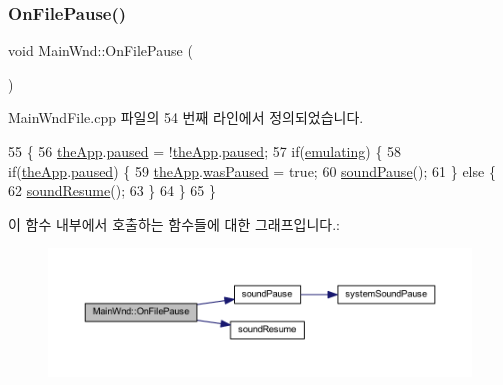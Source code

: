 \mbox{\label{class_main_wnd_a31048c989663d5e2121c2e96b6c8408d}} 
\subsubsection{\texorpdfstring{On\+File\+Pause()}{OnFilePause()}}
{\footnotesize\ttfamily void Main\+Wnd\+::\+On\+File\+Pause (\begin{DoxyParamCaption}{ }\end{DoxyParamCaption})\hspace{0.3cm}{\ttfamily [protected]}}



Main\+Wnd\+File.\+cpp 파일의 54 번째 라인에서 정의되었습니다.


\begin{DoxyCode}
55 \{
56   \mbox{\hyperlink{_v_b_a_8cpp_a8095a9d06b37a7efe3723f3218ad8fb3}{theApp}}.\mbox{\hyperlink{class_v_b_a_af7447bf3bf3f93948d2757e4cb223cfc}{paused}} = !\mbox{\hyperlink{_v_b_a_8cpp_a8095a9d06b37a7efe3723f3218ad8fb3}{theApp}}.\mbox{\hyperlink{class_v_b_a_af7447bf3bf3f93948d2757e4cb223cfc}{paused}};
57   \textcolor{keywordflow}{if}(\mbox{\hyperlink{_main_wnd_file_8cpp_af9cc36078b1b311753963297ae7f2a74}{emulating}}) \{
58     \textcolor{keywordflow}{if}(\mbox{\hyperlink{_v_b_a_8cpp_a8095a9d06b37a7efe3723f3218ad8fb3}{theApp}}.\mbox{\hyperlink{class_v_b_a_af7447bf3bf3f93948d2757e4cb223cfc}{paused}}) \{
59       \mbox{\hyperlink{_v_b_a_8cpp_a8095a9d06b37a7efe3723f3218ad8fb3}{theApp}}.\mbox{\hyperlink{class_v_b_a_a3c2e2ea8cb921007fcf2764da22c06e0}{wasPaused}} = \textcolor{keyword}{true};
60       \mbox{\hyperlink{_sound_8cpp_a0716e7957671de324eeaa4ac1729d6b7}{soundPause}}();
61     \} \textcolor{keywordflow}{else} \{
62       \mbox{\hyperlink{gb_sound_8cpp_af13240822604abd91b4e2370062f195e}{soundResume}}();
63     \}
64   \}
65 \}
\end{DoxyCode}
이 함수 내부에서 호출하는 함수들에 대한 그래프입니다.\+:
\nopagebreak
\begin{figure}[H]
\begin{center}
\leavevmode
\includegraphics[width=350pt]{class_main_wnd_a31048c989663d5e2121c2e96b6c8408d_cgraph}
\end{center}
\end{figure}
\mbox{\label{class_main_wnd_a0d7f7d468e486be90f1b6771bff84846}} 
